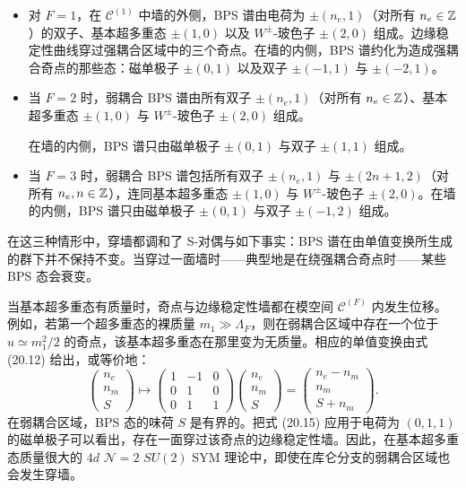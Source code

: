 \begin{itemize}
\item 对 $F=1$，在 $\mathcal{C}^{(1)}$ 中墙的外侧，BPS 谱由电荷为 $\pm(n_e,1)$（对所有 $n_e\in\mathbb{Z}$）的双子、基本超多重态 $\pm(1,0)$ 以及 $W^\pm$-玻色子 $\pm(2,0)$ 组成。边缘稳定性曲线穿过强耦合区域中的三个奇点。在墙的内侧，BPS 谱约化为造成强耦合奇点的那些态：磁单极子 $\pm(0,1)$ 以及双子 $\pm(-1,1)$ 与 $\pm(-2,1)$。
\item 当 $F=2$ 时，弱耦合 BPS 谱由所有双子 $\pm(n_e,1)$（对所有 $n_e\in\mathbb{Z}$）、基本超多重态 $\pm(1,0)$ 与 $W^\pm$-玻色子 $\pm(2,0)$ 组成。

在墙的内侧，BPS 谱只由磁单极子 $\pm(0,1)$ 与双子 $\pm(1,1)$ 组成。
\item 当 $F=3$ 时，弱耦合 BPS 谱包括所有双子 $\pm(n_e,1)$ 与 $\pm(2n+1,2)$（对所有 $n_e,n\in\mathbb{Z}$），连同基本超多重态 $\pm(1,0)$ 与 $W^\pm$-玻色子 $\pm(2,0)$。在墙的内侧，BPS 谱只由磁单极子 $\pm(0,1)$ 与双子 $\pm(-1,2)$ 组成。
\end{itemize}

\begin{remark}[20.27]
在这三种情形中，穿墙都调和了 S-对偶与如下事实：BPS 谱在由单值变换所生成的群下并不保持不变。当穿过一面墙时——典型地是在绕强耦合奇点时——某些 BPS 态会衰变。
\end{remark}

当基本超多重态有质量时，奇点与边缘稳定性墙都在模空间 $\mathcal{C}^{(F)}$ 内发生位移。例如，若第一个超多重态的裸质量 $m_1\gg\Lambda_F$，则在弱耦合区域中存在一个位于 $u\simeq m_1^2/2$ 的奇点，该基本超多重态在那里变为无质量。相应的单值变换由式 (20.12) 给出，或等价地：
\begin{equation}
\begin{pmatrix}n_e\\ n_m\\ S\end{pmatrix}\mapsto
\begin{pmatrix}1&-1&0\\0&1&0\\0&1&1\end{pmatrix}
\begin{pmatrix}n_e\\ n_m\\ S\end{pmatrix}
=\begin{pmatrix}n_e-n_m\\ n_m\\ S+n_m\end{pmatrix}.\tag{20.15}
\end{equation}
在弱耦合区域，BPS 态的味荷 $S$ 是有界的。把式 (20.15) 应用于电荷为 $(0,1,1)$ 的磁单极子可以看出，存在一面穿过该奇点的边缘稳定性墙。因此，在基本超多重态质量很大的 $4d$ $\mathcal{N}=2$ $SU(2)$ SYM 理论中，即使在库仑分支的弱耦合区域也会发生穿墙。

